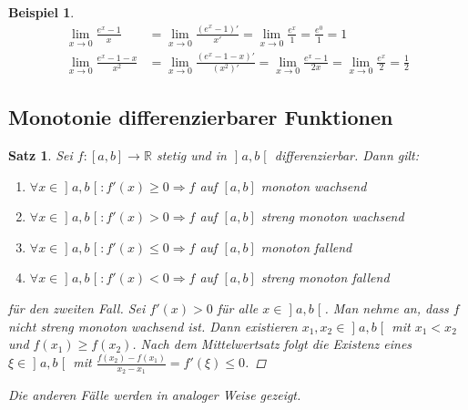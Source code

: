 \documentclass[ngerman,titlepage,twoside, parskip=half*]{scrreprt}
\newcommand*{\R}{\mathbb{R}}
\theoremstyle{break}
\newtheorem{theorem}{Satz}[section]
\theoremstyle{nonumberbreak}
\newtheorem{beispiel}{Beispiel}
\newtheorem{proof}{Beweis:}
\newcommand*{\bsofint}[1]{\mathopen{]}#1\mathclose{[}} %
\begin{document}
\begin{beispiel}
  \begin{align*}
    \lim_{x\rightarrow 0} \frac{e^x-1}{x} &= \lim_{x\rightarrow 0}
    \frac{(e^x-1)'}{x'} =\lim_{x\rightarrow 0}
    \frac{e^x}{1}=\frac{e^0}{1}=1\\
    \lim_{x\rightarrow 0} \frac{e^x-1-x}{x^2} &= \lim_{x\rightarrow 0}
    \frac{(e^x-1-x)'}{(x^2)'} =\lim_{x\rightarrow 0} \frac{e^x-1}{2x}=
    \lim_{x\rightarrow 0}\frac{e^x}{2}=\frac{1}{2}
  \end{align*}
\end{beispiel}

\subsection{Monotonie differenzierbarer Funktionen}
\begin{theorem}
  \label{satz:monoton}
  Sei $f\colon[a,b]\rightarrow\R$ stetig und in $\bsofint{a,b}$ differenzierbar. Dann
  gilt:
  \begin{enumerate}
    \item $\forall x \in \bsofint{a,b}\colon f'(x)\geq0 \Rightarrow f$ auf $[a,b]$
      monoton wachsend
    \item $\forall x \in \bsofint{a,b}\colon f'(x)> 0\Rightarrow f$ auf $[a,b]$ 
      streng monoton wachsend
    \item $\forall x \in \bsofint{a,b}\colon f'(x)\leq0 \Rightarrow f$ auf $[a,b]$
      monoton fallend
    \item $\forall x \in \bsofint{a,b}\colon f'(x)< 0\Rightarrow f$ auf $[a,b]$
      streng monoton fallend
  \end{enumerate}
  \begin{proof}[für den zweiten Fall]
    Sei $f'(x)>0$ für alle $x\in \bsofint{a,b}$. Man nehme an, dass
    $f$ nicht streng monoton wachsend ist. Dann existieren
    $x_1,x_2\in\bsofint{a,b}$ mit $x_1<x_2$ und $f(x_1)\geq
    f(x_2)$. Nach dem Mittelwertsatz folgt die Existenz eines
    $\xi\in\bsofint{a,b}$ mit $\frac{f(x_2)-f(x_1)}{x_2-x_1}
    =f'(\xi)\leq 0$\lightning.
  \end{proof}
  Die anderen Fälle werden in analoger Weise gezeigt.
\end{theorem}
\end{document}
